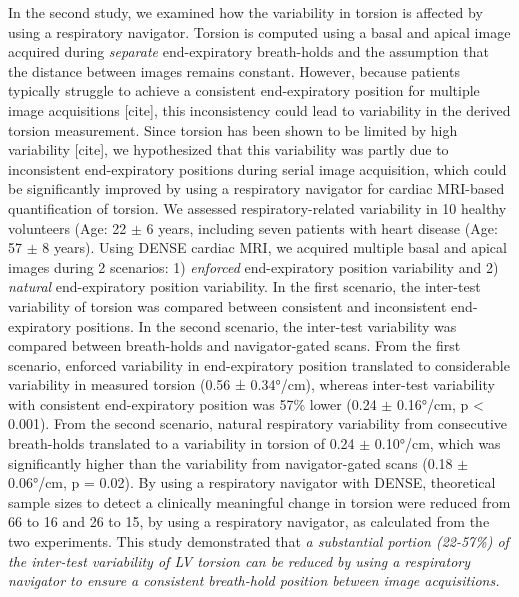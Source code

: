 	In the second study, we examined how the variability in torsion is affected by using a respiratory navigator. Torsion is computed using a basal and apical image acquired during \textit{separate} end-expiratory breath-holds and the assumption that the distance between images remains constant. However, because patients typically struggle to achieve a consistent end-expiratory position for multiple image acquisitions [cite], this inconsistency could lead to variability in the derived torsion measurement. Since torsion has been shown to be limited by high variability [cite], we hypothesized that this variability was partly due to inconsistent end-expiratory positions during serial image acquisition, which could be significantly improved by using a respiratory navigator for cardiac MRI-based quantification of torsion. We assessed respiratory-related variability in 10 healthy volunteers (Age: 22 $\pm$ 6 years, including seven patients with heart disease (Age: 57 $\pm$ 8 years). Using DENSE cardiac MRI, we acquired multiple basal and apical images during 2 scenarios: 1) \textit{enforced} end-expiratory position variability and 2) \textit{natural} end-expiratory position variability. In the first scenario, the inter-test variability of torsion was compared between consistent and inconsistent end-expiratory positions. In the second scenario, the inter-test variability was compared between breath-holds and navigator-gated scans. From the first scenario, enforced variability in end-expiratory position translated to considerable variability in measured torsion (0.56 ± 0.34°/cm), whereas inter-test variability with consistent end-expiratory position was 57\% lower (0.24 $\pm$ 0.16°/cm, p < 0.001). From the second scenario, natural respiratory variability from consecutive breath-holds translated to a variability in torsion of 0.24 $\pm$ 0.10°/cm, which was significantly higher than the variability from navigator-gated scans (0.18 $\pm$ 0.06°/cm, p = 0.02). By using a respiratory navigator with DENSE, theoretical sample sizes to detect a clinically meaningful change in torsion were reduced from 66 to 16 and 26 to 15, by using a respiratory navigator, as calculated from the two experiments. This study demonstrated that \textit{a substantial portion (22-57\%) of the inter-test variability of LV torsion can be reduced by using a respiratory navigator to ensure a consistent breath-hold position between image acquisitions.}

